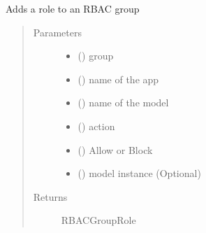 \documentclass[letterpaper,10pt,english]{sphinxmanual}
\begin{document}
\begin{fulllineitems}
\label{\detokenize{rbac:rbac.core.rbac_add_role_to_group}}
Adds a role to an RBAC group
\begin{quote}\begin{description}
\item[{Parameters}] \leavevmode\begin{itemize}
\item {} 
 ({\hyperref[\detokenize{rbac:rbac.models.RBACGroup}]{}}) \textendash{} group

\item {} 
 () \textendash{} name of the app

\item {} 
 () \textendash{} name of the model

\item {} 
 () \textendash{} action

\item {} 
 () \textendash{} Allow or Block

\item {} 
 () \textendash{} model instance (Optional)

\end{itemize}

\item[{Returns}] \leavevmode
RBACGroupRole

\end{description}\end{quote}

\end{fulllineitems}
\end{document}
